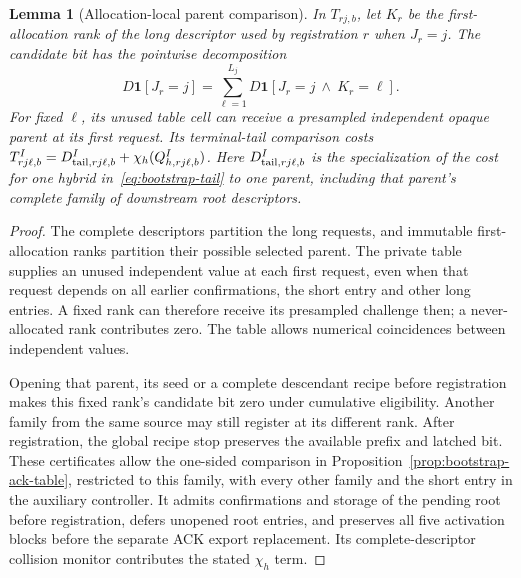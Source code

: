 \documentclass[pdflatex]{sn-jnl}
\theoremstyle{thmstyleone}
\newtheorem{lemma}[theorem]{Lemma}
\theoremstyle{thmstylethree}
\theoremstyle{thmstyletwo}
\begin{document}
\begin{lemma}[Allocation-local parent comparison]
\label{lem:bootstrap-initial-allocation}
In $T_{rj,b}$, let $K_r$ be the first-allocation rank of the long
descriptor used by registration $r$ when $J_r=j$. The candidate bit
has the pointwise decomposition
\[
 D\mathbf1[J_r=j]=\sum_{\ell=1}^{L_j}
       D\mathbf1[J_r=j\ \land\ K_r=\ell].
\]
For fixed $\ell$, its unused table cell can receive a presampled
independent opaque parent at its first request. Its terminal-tail
comparison costs
$T^I_{rj\ell,b}=D^I_{{\rm tail},rj\ell,b}
                    +\chi_h(Q^I_{h,rj\ell,b})$.
Here $D^I_{{\rm tail},rj\ell,b}$ is the specialization of the cost for one
hybrid in~\eqref{eq:bootstrap-tail} to one parent, including that parent's
complete family of downstream root descriptors.
\end{lemma}
\begin{proof}
The complete descriptors partition the long requests, and immutable
first-allocation ranks partition their possible selected parent. The
private table supplies an unused independent value at each first request,
even when that request depends on all earlier confirmations, the short
entry and other long entries. A fixed rank can therefore receive its
presampled challenge then; a never-allocated rank contributes zero.
The table allows numerical coincidences between independent values.

Opening that parent, its seed or a complete descendant recipe before
registration makes this fixed rank's candidate bit zero under cumulative
eligibility. Another family from the same source may still register at
its different rank. After registration, the global recipe stop preserves
the available prefix and latched bit. These certificates allow the
one-sided comparison in Proposition~\ref{prop:bootstrap-ack-table},
restricted to this family, with every other family and the short entry in the auxiliary
controller. It admits confirmations and storage of the pending root before
registration, defers unopened root entries, and preserves all five
activation blocks before the separate ACK export replacement. Its
complete-descriptor collision monitor contributes the stated
$\chi_h$ term.
\end{proof}
\end{document}

